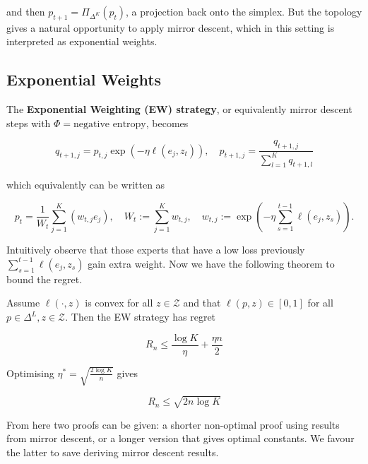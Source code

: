 and then $p_{t+1} = \Pi_{\Delta^K}(p_t)$, a projection back onto the simplex. But the topology gives a natural opportunity to apply mirror descent, which in this setting is interpreted as exponential weights. 

\subsection{Exponential Weights}

The \textbf{Exponential Weighting (EW) strategy}, or equivalently mirror descent steps with $\Phi = \text{negative entropy}$, becomes

$$
	q_{t+1,j} = p_{t,j} \exp( -\eta \ell(e_j,z_t)), \quad  
	p_{t+1,j} = \frac{q_{t+1,j} }{\sum_{l=1}^K q_{t+1,l} }
$$

which equivalently can be written as 

$$
	p_t = \frac{1}{W_{t}} \sum_{j=1}^K \left( 
	w_{t,j} e_j
	\right), \quad 
	W_{t}:= \sum_{j=1}^K w_{t,j},
	 \quad 
	w_{t,j}:= \exp \left( 
	- \eta \sum_{s=1}^{t-1} \ell( e_j,z_s)
	\right).
$$

Intuitively observe that those experts that have a low loss previously $\sum_{s=1}^{t-1} \ell( e_j,z_s)$ gain extra weight. Now we have the following theorem to bound the regret.

\begin{theorem}
Assume $\ell(\cdot,z)$ is convex for all $z \in \mathcal{Z}$ and that $\ell(p,z) \in [0,1]$ for all $p \in \Delta^L, z \in \mathcal{Z}$. Then the EW strategy has regret 

$$
	R_n \leq \frac{\log K}{\eta} + \frac{\eta n}{2} 
$$

Optimising $\eta^* = \sqrt{\frac{2 \log K}{n}}$ gives 

$$
	R_n \leq \sqrt{ 2n \log K}
$$

\end{theorem}

From here two proofs can be given: a shorter non-optimal proof using results from mirror descent, or a longer version that gives optimal constants. We favour the latter to save deriving mirror descent results.


